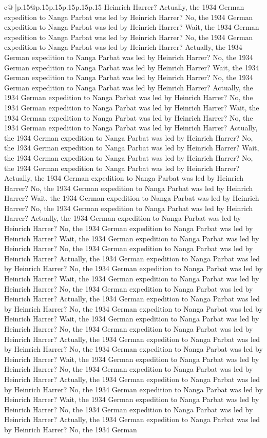 \documentclass{article}
\begin{document}
{\begin{supertabular}{c@{$\;$}|p{.15\linewidth}@{}p{.15\linewidth}p{.15\linewidth}p{.15\linewidth}p{.15\linewidth}p{.15\linewidth}}
{{{Heinrich Harrer? Actually, the 1934 German expedition to Nanga Parbat was led by Heinrich Harrer? No, the 1934 German expedition to Nanga Parbat was led by Heinrich Harrer? Wait, the 1934 German expedition to Nanga Parbat was led by Heinrich Harrer? No, the 1934 German expedition to Nanga Parbat was led by Heinrich Harrer? Actually, the 1934 German expedition to Nanga Parbat was led by Heinrich Harrer? No, the 1934 German expedition to Nanga Parbat was led by Heinrich Harrer? Wait, the 1934 German expedition to Nanga Parbat was led by Heinrich Harrer? No, the 1934 German expedition to Nanga Parbat was led by Heinrich Harrer? Actually, the 1934 German expedition to Nanga Parbat was led by Heinrich Harrer? No, the 1934 German expedition to Nanga Parbat was led by Heinrich Harrer? Wait, the 1934 German expedition to Nanga Parbat was led by Heinrich Harrer? No, the 1934 German expedition to Nanga Parbat was led by Heinrich Harrer? Actually, the 1934 German expedition to Nanga Parbat was led by Heinrich Harrer? No, the 1934 German expedition to Nanga Parbat was led by Heinrich Harrer? Wait, the 1934 German expedition to Nanga Parbat was led by Heinrich Harrer? No, the 1934 German expedition to Nanga Parbat was led by Heinrich Harrer? Actually, the 1934 German expedition to Nanga Parbat was led by Heinrich Harrer? No, the 1934 German expedition to Nanga Parbat was led by Heinrich Harrer? Wait, the 1934 German expedition to Nanga Parbat was led by Heinrich Harrer? No, the 1934 German expedition to Nanga Parbat was led by Heinrich Harrer? Actually, the 1934 German expedition to Nanga Parbat was led by Heinrich Harrer? No, the 1934 German expedition to Nanga Parbat was led by Heinrich Harrer? Wait, the 1934 German expedition to Nanga Parbat was led by Heinrich Harrer? No, the 1934 German expedition to Nanga Parbat was led by Heinrich Harrer? Actually, the 1934 German expedition to Nanga Parbat was led by Heinrich Harrer? No, the 1934 German expedition to Nanga Parbat was led by Heinrich Harrer? Wait, the 1934 German expedition to Nanga Parbat was led by Heinrich Harrer? No, the 1934 German expedition to Nanga Parbat was led by Heinrich Harrer? Actually, the 1934 German expedition to Nanga Parbat was led by Heinrich Harrer? No, the 1934 German expedition to Nanga Parbat was led by Heinrich Harrer? Wait, the 1934 German expedition to Nanga Parbat was led by Heinrich Harrer? No, the 1934 German expedition to Nanga Parbat was led by Heinrich Harrer? Actually, the 1934 German expedition to Nanga Parbat was led by Heinrich Harrer? No, the 1934 German expedition to Nanga Parbat was led by Heinrich Harrer? Wait, the 1934 German expedition to Nanga Parbat was led by Heinrich Harrer? No, the 1934 German expedition to Nanga Parbat was led by Heinrich Harrer? Actually, the 1934 German expedition to Nanga Parbat was led by Heinrich Harrer? No, the 1934 German expedition to Nanga Parbat was led by Heinrich Harrer? Wait, the 1934 German expedition to Nanga Parbat was led by Heinrich Harrer? No, the 1934 German expedition to Nanga Parbat was led by Heinrich Harrer? Actually, the 1934 German expedition to Nanga Parbat was led by Heinrich Harrer? No, the 1934 German }}}
\end{supertabular}}
\end{document}
